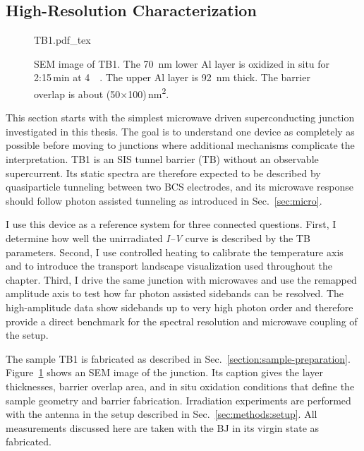 \subsection{High-Resolution Characterization}
\label{subsec:tb:highres}

    \begin{figure}
        \captionsetup{format=plain}%
        \vspace{-1.0em}
        \centering
        {\fontsize{7}{9}\selectfont
            {TB1.pdf_tex}
            }
        \vspace{-1.5em}
        \caption{
                SEM image of TB1. The \qty{70}{\nano\meter} lower Al layer is oxidized in situ for 2:15\,\unit{\minute} at \qty{4}{\milli\barunit}. The upper Al layer is \qty{92}{\nano\meter} thick. The barrier overlap is about (50$\times$100)\,\unit{\nano\meter\squared}.
            }
        \label{fig:tb:highres:image-TB1}
    \end{figure}

    This section starts with the simplest microwave driven superconducting junction investigated in this thesis. The goal is to understand one device as completely as possible before moving to junctions where additional mechanisms complicate the interpretation. TB1 is an SIS tunnel barrier (TB) without an observable supercurrent. Its static spectra are therefore expected to be described by quasiparticle tunneling between two BCS electrodes, and its microwave response should follow photon assisted tunneling as introduced in Sec.~\ref{sec:micro}.

    I use this device as a reference system for three connected questions. First, I determine how well the unirradiated \textit{I--V} curve is described by the TB parameters. Second, I use controlled heating to calibrate the temperature axis and to introduce the transport landscape visualization used throughout the chapter. Third, I drive the same junction with microwaves and use the remapped amplitude axis to test how far photon assisted sidebands can be resolved. The high-amplitude data show sidebands up to very high photon order and therefore provide a direct benchmark for the spectral resolution and microwave coupling of the setup.

    The sample TB1 is fabricated as described in Sec.~\ref{section:sample-preparation}. Figure~\ref{fig:tb:highres:image-TB1} shows an SEM image of the junction. Its caption gives the layer thicknesses, barrier overlap area, and in situ oxidation conditions that define the sample geometry and barrier fabrication. Irradiation experiments are performed with the antenna in the setup described in Sec.~\ref{sec:methods:setup}. All measurements discussed here are taken with the BJ in its virgin state as fabricated.
    
